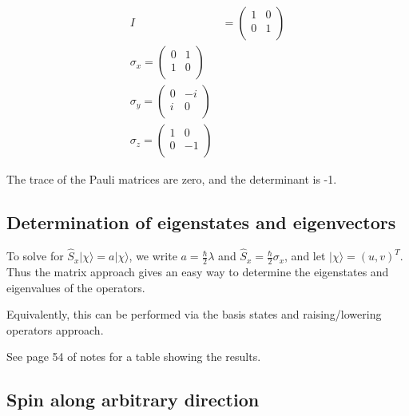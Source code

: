 \documentclass[11pt]{article}
\begin{document}
\begin{align*}

I &= 

\begin{pmatrix}
1 & 0 \\
0 & 1\\
\end{pmatrix}\\

\sigma_x = 
\begin{pmatrix}
0 & 1 \\
1 & 0\\
\end{pmatrix}\\

\sigma_y =
\begin{pmatrix}
0 & -i \\
i & 0\\
\end{pmatrix}\\

\sigma_z = 
\begin{pmatrix}
1 & 0 \\
0 & -1 \\
\end{pmatrix}

\end{align*}

The trace of the Pauli matrices are zero, and the determinant is -1. 

\subsection{Determination of eigenstates and eigenvectors}
\label{sec:org5a1eb00}

To solve for \(\hat{S}_x |\chi\rangle = a |\chi \rangle\), we write \(a =
\frac\hbar2\lambda\) and \(\hat{S}_x = \frac\hbar2\sigma_x\), and let
\(|\chi\rangle = (u,v)^T\). Thus the matrix approach gives an easy way
to determine the eigenstates and eigenvalues of the operators.

Equivalently, this can be performed via the basis states and
raising/lowering operators approach.

See page 54 of notes for a table showing the results. 


\subsection{Spin along arbitrary direction}
\label{sec:orgece081d}
\end{document}
